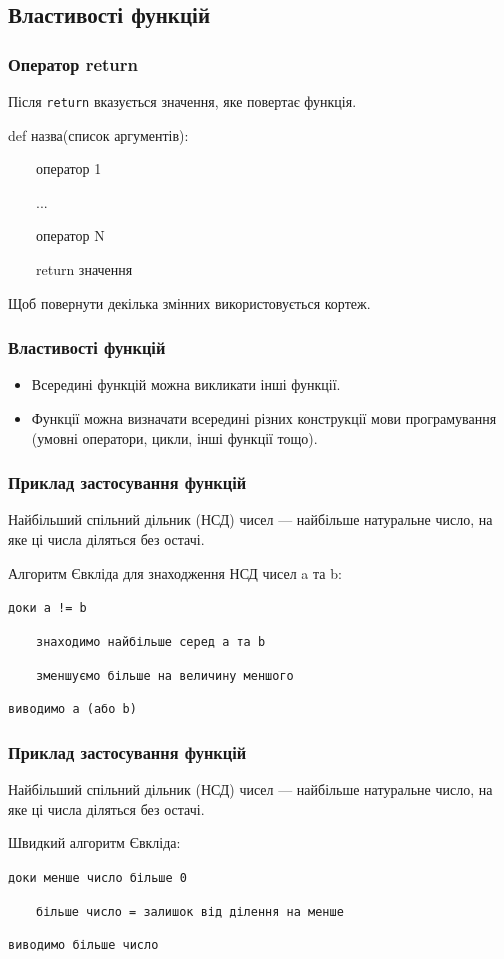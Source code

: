 \subsection{Властивості функцій} 
\begin{frame}
\frametitle{Оператор return}
Після \texttt{return} вказується значення, яке повертає функція.

\Large{def назва(список аргументів):

~~~~оператор 1

~~~~... 

~~~~оператор N

~~~~return значення }

\normalsize Щоб повернути декілька змінних використовується кортеж.

\end{frame}

\begin{frame}
\frametitle{Властивості функцій}
\begin{itemize}
  \item Всередині функцій можна викликати інші функції.
  \item Функції можна визначати всередині різних конструкції мови програмування (умовні оператори, цикли, інші функції тощо).

\end{itemize}

\end{frame}

\begin{frame}
\frametitle{Приклад застосування функцій}
Найбільший спільний дільник (НСД) чисел — найбільше натуральне число, на яке ці числа діляться без остачі. 

Алгоритм Євкліда для знаходження НСД чисел a та b:

\texttt{доки а != b} 

~~~~\texttt{знаходимо найбільше серед а та b}


~~~~\texttt{зменшуємо більше на величину меншого}

\texttt{виводимо а (або b)}

\end{frame}

\begin{frame}
\frametitle{Приклад застосування функцій}
Найбільший спільний дільник (НСД) чисел — найбільше натуральне число, на яке ці числа діляться без остачі. 


Швидкий алгоритм Євкліда:

\texttt{доки менше число більше 0}

~~~~\texttt{більше число = залишок від ділення на менше} 

\texttt{виводимо більше число}
\end{frame}

